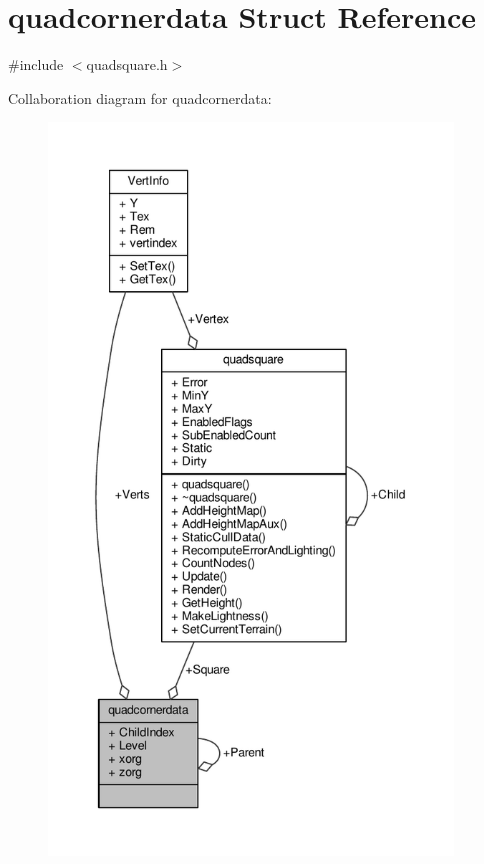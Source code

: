 \hypertarget{structquadcornerdata}{}\section{quadcornerdata Struct Reference}
\label{structquadcornerdata}


{\ttfamily \#include $<$quadsquare.\+h$>$}



Collaboration diagram for quadcornerdata\+:
\nopagebreak
\begin{figure}[H]
\begin{center}
\leavevmode
\includegraphics[height=550pt]{d7/ddf/structquadcornerdata__coll__graph}
\end{center}
\end{figure}
